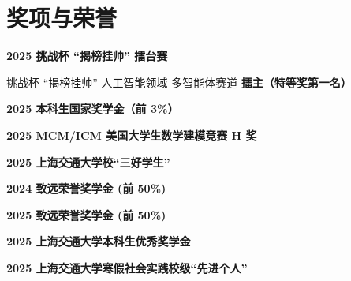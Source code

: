 \documentclass[letterpaper,11pt]{article}
\begin{document}
\section{奖项与荣誉}

\textbf{2025 挑战杯 “揭榜挂帅” 擂台赛}

挑战杯 “揭榜挂帅” 人工智能领域 多智能体赛道 \textbf{擂主（特等奖第一名）}

\medskip

\textbf{2025 本科生国家奖学金（前 3\%）}

\medskip

\textbf{2025 MCM/ICM 美国大学生数学建模竞赛 H 奖}

\medskip

\textbf{2025 上海交通大学校“三好学生”}

\medskip

\textbf{2024 致远荣誉奖学金 (前 50\%)}

\medskip

\textbf{2025 致远荣誉奖学金 (前 50\%)}

\medskip

\textbf{2025 上海交通大学本科生优秀奖学金}

\medskip

\textbf{2025 上海交通大学寒假社会实践校级“先进个人”}
\end{document}
